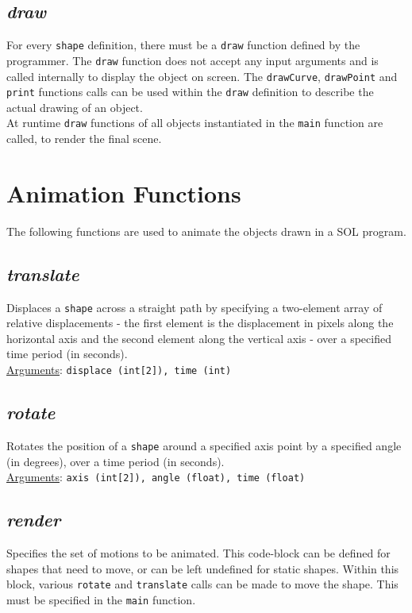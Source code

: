     \subsection{\textit{draw}}
    For every \texttt{shape} definition, there must be a \texttt{draw} function defined by the programmer. The \texttt{draw} function does not accept any input arguments and is called internally to display the object on screen. The \texttt{drawCurve}, \texttt{drawPoint} and \texttt{print} functions calls can be used within the \texttt{draw} definition to describe the actual drawing of an object.\\
    At runtime \texttt{draw} functions of all objects instantiated in the \texttt{main} function are called, to render the final scene.

\section{Animation Functions} \label{animation}
The following functions are used to animate the objects drawn in a SOL program.

    \subsection{\textit{translate}}
    Displaces a \texttt{shape} across a straight path by specifying a two-element array of relative displacements - the first element is the displacement in pixels along the horizontal axis and the second element along the vertical axis - over a specified time period (in seconds).\\
    \underline{Arguments}: \texttt{displace (int[2]), time (int)}

    \subsection{\textit{rotate}}
    Rotates the position of a \texttt{shape} around a specified axis point by a specified angle (in degrees), over a time period (in seconds).\\
    \underline{Arguments}: \texttt{axis (int[2]), angle (float), time (float)}

    \subsection{\textit{render}}
    Specifies the set of motions to be animated. This code-block can be defined for shapes that need to move, or can be left undefined for static shapes. Within this block, various \texttt{rotate} and \texttt{translate} calls can be made to move the shape. This must be specified in the \texttt{main} function.\\

